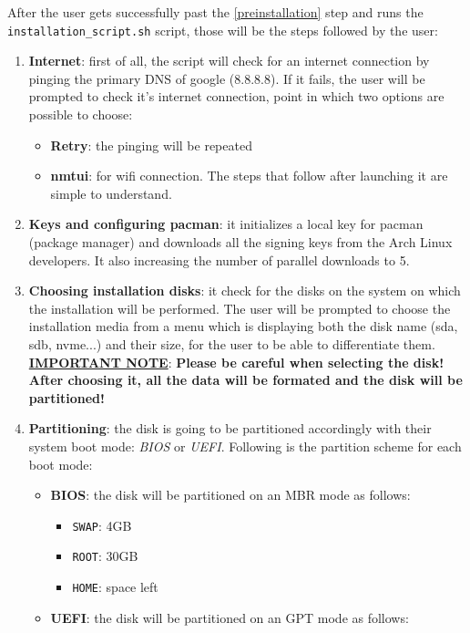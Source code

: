 \documentclass{article}
\begin{document}
After the user gets successfully past the \ref{preinstallation} step and runs the \texttt{installation\_script.sh} script, those will be the steps followed by the user:
\begin{enumerate}
	\item \textbf{Internet}: first of all, the script will check for an internet connection by pinging the primary DNS of google (8.8.8.8). If it fails, the user will be prompted to check it's internet connection, point in which two options are possible to choose:
	\begin{itemize}
		\item \textbf{Retry}: the pinging will be repeated
		\item \textbf{nmtui}: for wifi connection. The steps that follow after launching it are simple to understand.
	\end{itemize}
	\item \textbf{Keys and configuring pacman}: it initializes a local key for pacman (package manager) and downloads all the signing keys from the Arch Linux developers. It also increasing the number of parallel downloads to 5. 
	\item \textbf{Choosing installation disks}: it check for the disks on the system on which the installation will be performed. The user will be prompted to choose the installation media from a menu which is displaying both the disk name (sda, sdb, nvme...) and their size, for the user to be able to differentiate them.\\
	\newline
	\underline{\textbf{IMPORTANT NOTE}}: \textbf{Please be careful when selecting the disk! After choosing it, all the data will be formated and the disk will be partitioned!}
	\item \textbf{Partitioning}: the disk is going to be partitioned accordingly with their system boot mode: \textit{BIOS} or \textit{UEFI}. Following is the partition scheme for each boot mode:
	\begin{itemize}
		\item \textbf{BIOS}: the disk will be partitioned on an MBR mode as follows:
		\begin{itemize}
			\item \texttt{SWAP}: 4GB
			\item \texttt{ROOT}: 30GB
			\item \texttt{HOME}: space left
		\end{itemize}
		\item \textbf{UEFI}: the disk will be partitioned on an GPT mode as follows:

\end{itemize}
\end{enumerate}
\end{document}
